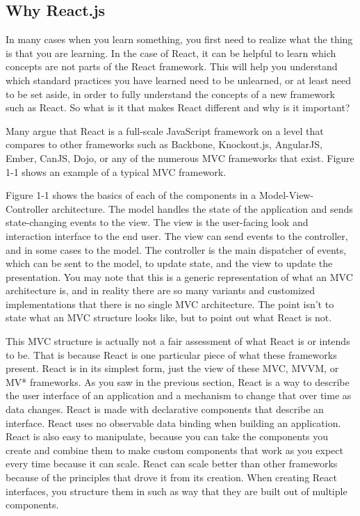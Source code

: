 \subsection{Why React.js}

In many cases when you learn something, you first need to realize what the thing is that you are learning. In the case of React, it can be helpful to learn which concepts are not parts of the React framework. This will help you understand which standard practices you have learned need to be unlearned, or at least need to be set aside, in order to fully understand the concepts of a new framework such as React. So what is it that makes React different and why is it important?

Many argue that React is a full-scale JavaScript framework on a level that compares to other frameworks such as Backbone, Knockout.js, AngularJS, Ember, CanJS, Dojo, or any of the numerous MVC frameworks that exist. Figure 1-1 shows an example of a typical MVC framework.

Figure 1-1 shows the basics of each of the components in a Model-View-Controller architecture. The model handles the state of the application and sends state-changing events to the view. The view is the user-facing look and interaction interface to the end user. The view can send events to the controller, and in some cases to the model. The controller is the main dispatcher of events, which can be sent to the model, to update state, and the view to update the presentation. You may note that this is a generic representation of what an MVC architecture is, and in reality there are so many variants and customized implementations that there is no single MVC architecture. The point isn’t to state what an MVC structure looks like, but to point out what React is not.

This MVC structure is actually not a fair assessment of what React is or intends to be. That is because React is one particular piece of what these frameworks present. React is in its simplest form, just the view of these MVC, MVVM, or MV* frameworks. As you saw in the previous section, React is a way to describe the user interface of an application and a mechanism to change that over time as data changes. React is made with declarative components that describe an interface. React uses no observable data binding when building an application. React is also easy to manipulate, because you can take the components you create and combine them to make custom components that work as you expect every time because it can scale. React can scale better than other frameworks because of the principles that drove it from its creation. When creating React interfaces, you structure them in such as way that they are built out of multiple components.

